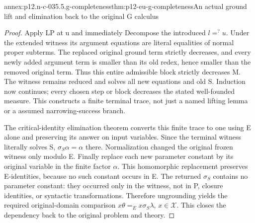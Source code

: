\begin{annexitem}{annex:p12.n-c-035.5.g-completeness}{thm:p12-eu-g-completeness}{An actual ground lift and elimination back to the original G calculus}
\begin{proof}
Apply LP at u and immediately Decompose the introduced
\(l=^{?}u\). Under the extended witness its argument equations
are literal equalities of normal proper subterms. The replaced
original ground term strictly decreases, and every newly added
argument term is smaller than its old redex, hence smaller than
the removed original term. Thus this entire admissible block
strictly decreases M. The witness remains reduced and solves all
new equations and old S. Induction now continues; every chosen
step or block decreases the stated well-founded measure.
This constructs a finite terminal trace, not just a named lifting
lemma or a assumed narrowing-success branch.

The critical-identity elimination theorem converts this finite
trace to one using E alone and preserving its answer on input
variables. Since the terminal witness literally solves S,
\(\sigma_S\alpha=\alpha\) there. Normalization changed the
original frozen witness only modulo E. Finally replace each new
parameter constant by its original variable in the finite factor
\(\alpha\). This homomorphic replacement preserves E-identities,
because no such constant occurs in E. The returned \(\sigma_S\)
contains no parameter constant: they occurred only in the witness,
not in P, closure identities, or syntactic transformations. Therefore
ungrounding yields the required original-domain comparison
\(x\theta=_E x\sigma_S\lambda\), \(x\in\mathcal X\).
This closes the dependency back to the original problem and theory.
\end{proof}
\end{annexitem}

